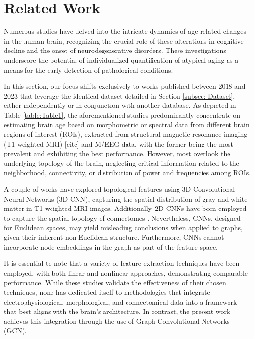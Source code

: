 \documentclass{cys}
\begin{document}
\section{Related Work}
\label{sec:relatedWork}

Numerous studies have delved into the intricate dynamics of age-related changes in the human brain, recognizing the crucial role of these alterations in cognitive decline and the onset of neurodegenerative disorders. These investigations underscore the potential of individualized quantification of atypical aging as a means for the early detection of pathological conditions.

\bigskip
In this section, our focus shifts exclusively to works published between 2018 and 2023 that leverage the identical dataset detailed in Section \ref{subsec: Dataset}, either independently or in conjunction with another database. As depicted in Table \ref{table:Table1}, the aforementioned studies predominantly concentrate on estimating brain age based on morphometric or spectral data from different brain regions of interest (ROIs), extracted from structural magnetic resonance imaging (T1-weighted MRI) [cite] and M/EEG data, with the former being the most prevalent and exhibiting the best performance. However, most overlook the underlying topology of the brain, neglecting critical information related to the neighborhood, connectivity, or distribution of power and frequencies among ROIs.

\bigskip
A couple of works have explored topological features using 3D Convolutional Neural Networks (3D CNN), capturing the spatial distribution of gray and white matter in T1-weighted MRI images. Additionally, 2D CNNs have been employed to capture the spatial topology of connectomes \cite{li2022brain}. Nevertheless, CNNs, designed for Euclidean spaces, may yield misleading conclusions when applied to graphs, given their inherent non-Euclidean structure. Furthermore, CNNs cannot incorporate node embeddings in the graph as part of the feature space.

\bigskip
It is essential to note that a variety of feature extraction techniques have been employed, with both linear and nonlinear approaches, demonstrating comparable performance. While these studies validate the effectiveness of their chosen techniques, none has dedicated itself to methodologies that integrate electrophysiological, morphological, and connectomical data into a framework that best aligns with the brain's architecture. In contrast, the present work achieves this integration through the use of Graph Convolutional Networks (GCN).
\end{document}
